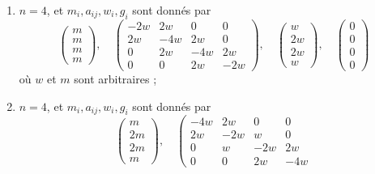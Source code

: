 \begin{lemma}[Genre un]
\begin{enumerate}
$$\begin{matrix}
0 & 0 & 4w & -8w
\end{matrix}
\right),
\quad
\left(
\begin{matrix}
w \\
2w \\
2w \\
4w
\end{matrix}
\right),
\quad
\left(
\begin{matrix}
0 \\
0 \\
0 \\
0
\end{matrix}
\right)
$$
où $w$ et $m$ sont arbitraires ;
\item
\label{item-up-equal-down}
$n = 4$, et $m_i, a_{ij}, w_i, g_i$ sont donnés par
$$
\left(
\begin{matrix}
m \\
m \\
m \\
m
\end{matrix}
\right),
\quad
\left(
\begin{matrix}
-2w & 2w & 0 & 0 \\
2w & -4w & 2w & 0 \\
0 & 2w & -4w & 2w \\
0 & 0 & 2w & -2w
\end{matrix}
\right),
\quad
\left(
\begin{matrix}
w \\
2w \\
2w \\
w
\end{matrix}
\right),
\quad
\left(
\begin{matrix}
0 \\
0 \\
0 \\
0
\end{matrix}
\right)
$$
où $w$ et $m$ sont arbitraires ;
\item
\label{item-down-equal-up}
$n = 4$, et $m_i, a_{ij}, w_i, g_i$ sont donnés par
$$
\left(
\begin{matrix}
m \\
2m \\
2m \\
m
\end{matrix}
\right),
\quad
\left(
\begin{matrix}
-4w & 2w & 0 & 0 \\
2w & -2w & w & 0 \\
0 & w & -2w & 2w \\
0 & 0 & 2w & -4w
\end{matrix}
$$
\end{enumerate}
\end{lemma}
